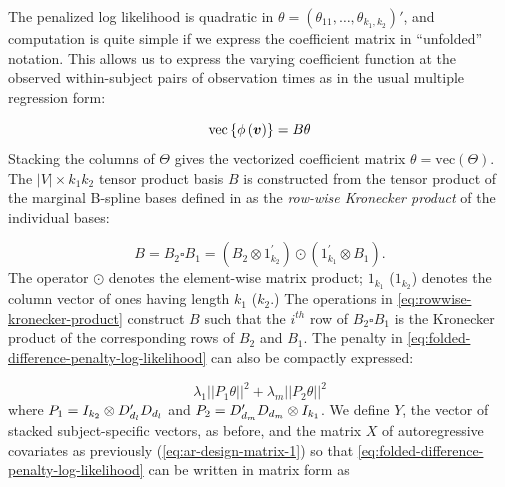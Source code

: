 \vspace{0.5cm}

The penalized log likelihood is quadratic in $\theta = \left(\theta_{11}, \dots, \theta_{k_1, k_2} \right)'$, and computation is quite simple if we express the coefficient matrix in ``unfolded'' notation. This allows us to express the varying coefficient function at the observed within-subject pairs of observation times as in the usual multiple regression form:

\begin{equation*}
\mbox{vec}\left\{\phi\left( \mbox{\boldmath $v$} \right)\right\} = B \theta
\end{equation*}
\noindent
Stacking the columns of $\Theta$ gives the vectorized coefficient matrix $\theta = \mbox{vec}\left( \Theta \right)$. The $\vert V \vert \times k_1 k_2$ tensor product basis $B$ is constructed from the tensor product of the marginal B-spline bases defined in \citet{eilers2006fast} as the \textit{row-wise Kronecker product} of the individual bases:

\begin{equation} \label{eq:rowwise-kronecker-product}
B = B_2 \square B_1 = \left( B_2 \otimes 1^\prime_{k_2} \right) \odot \left(1^\prime_{k_1} \otimes  B_1  \right).
\end{equation}
\noindent
The operator $\odot$ denotes the element-wise matrix product; $1_{k_1}$ ($1_{k_2}$) denotes the column vector of ones having length $k_1$ ($k_2$.) The operations in \ref{eq:rowwise-kronecker-product} construct $B$ such that the $i^{th}$ row of $B_2\square B_1$ is the Kronecker product of the corresponding rows of $B_2$ and $B_1$. The penalty in \ref{eq:folded-difference-penalty-log-likelihood} can also be compactly expressed:

\begin{equation*} \label{eq:tensor-product-penalty}
\lambda_1 \vert \vert P_1 \theta \vert \vert^2 + \lambda_m \vert \vert P_2 \theta \vert\vert^2
\end{equation*}
\noindent
where $P_1 = I_{k_2} \otimes D'_{d_{\scriptscriptstyle l}} D_{d_{\scriptscriptstyle l}} $ and $P_2 =  D'_{d_{\scriptscriptstyle m}} D_{d_{\scriptscriptstyle m}} \otimes I_{k_1}$. We define $Y$, the vector of stacked subject-specific vectors,  as before, and the matrix $X$ of autoregressive covariates as previously (\ref{eq:ar-design-matrix-1}) so that \ref{eq:folded-difference-penalty-log-likelihood} can be written in matrix form as

